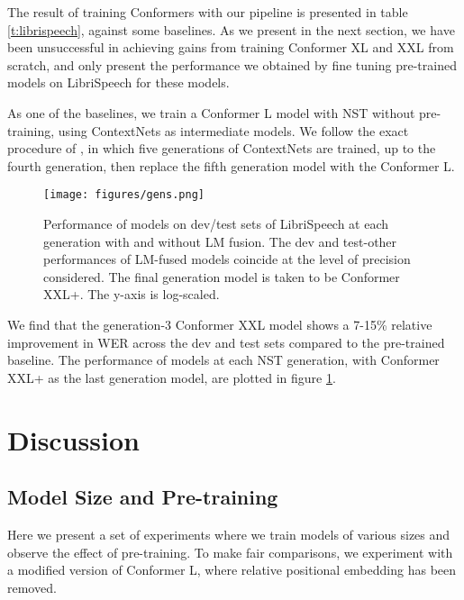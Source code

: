 \documentclass[dvipsnames]{article}
\begin{document}
The result of training Conformers with our pipeline is presented in table \ref{t:librispeech}, against some baselines. As we present in the next section, we have been unsuccessful in achieving gains from training Conformer XL and XXL from scratch, and only present the performance we obtained by fine tuning pre-trained models on LibriSpeech for these models.

As one of the baselines, we train a Conformer L model with NST without pre-training, using ContextNets \cite{contextnet} as intermediate models. We follow the exact procedure of \cite{nstasr}, in which five generations of ContextNets are trained, up to the fourth generation, then replace the fifth generation model with the Conformer L.

\begin{figure}[h!]
\centering
\texttt{[image: figures/gens.png]}
\vskip 0.05in
\caption{Performance of models on dev/test sets of LibriSpeech at each generation with and without LM fusion. The dev and test-other performances of LM-fused models coincide at the level of precision considered. The final generation model is taken to be Conformer XXL+. The y-axis is log-scaled.}
\label{f:gens}
\end{figure}

We find that the generation-3 Conformer XXL model shows a 7-15\% relative improvement in WER across the dev and test sets compared to the pre-trained baseline. The performance of models at each NST generation, with Conformer XXL+ as the last generation model, are plotted in figure \ref{f:gens}.



\section{Discussion}

\subsection{Model Size and Pre-training} \label{ss:model size}

Here we present a set of experiments where we train models of various sizes and observe the effect of pre-training. To make fair comparisons, we experiment with a modified version of Conformer L, where relative positional embedding has been removed.
\end{document}
